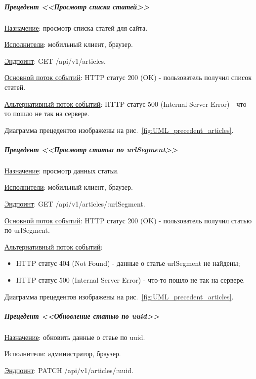 \subparagraph{Прецедент <<Просмотр списка статей>>} \hspace{0pt}

\underline{Назначение}: просмотр списка статей для сайта.

\underline{Исполнители}: мобильный клиент, браузер.

\underline{Эндпоинт}: GET /api/v1/articles.


\underline{Основной поток событий}: HTTP статус 200 (OK) - пользователь получил список статей. 

\underline{Альтернативный поток событий}:
HTTP статус 500 (Internal Server Error) - что-то пошло не так на сервере.

Диаграмма прецедентов изображены на рис.~\ref{fig:UML_precedent_articles}.


\subparagraph{Прецедент <<Просмотр статьи по urlSegment>>} \hspace{0pt}

\underline{Назначение}: просмотр данных статьи.

\underline{Исполнители}: мобильный клиент, браузер.

\underline{Эндпоинт}: GET /api/v1/articles/:urlSegment.


\underline{Основной поток событий}: HTTP статус 200 (OK) - пользователь получил статью по urlSegment. 

\underline{Альтернативный поток событий}:

\begin{itemize}
    \item HTTP статус 404 (Not Found) - данные о статье urlSegment не найдены;
    \item HTTP статус 500 (Internal Server Error) - что-то пошло не так на сервере.
\end{itemize}

Диаграмма прецедентов изображены на рис.~\ref{fig:UML_precedent_articles}.


\subparagraph{Прецедент <<Обновление статью по uuid>>} \hspace{0pt}

\underline{Назначение}: обновить данные о стаье по uuid.

\underline{Исполнители}: администратор, браузер.

\underline{Эндпоинт}: PATCH /api/v1/articles/:uuid.


